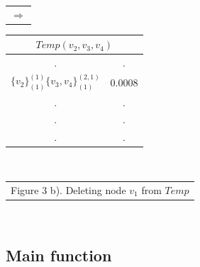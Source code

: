\documentclass[11pt]{article}
\begin{document}
\begin{table}[!htb]
\begin{minipage}{.06\linewidth}
        \begin{tabular}{c}
     $ \Rightarrow$\\
        \end{tabular}
    \end{minipage}%
    \begin{minipage}{.3\linewidth}
      \centering
     \begin{tabular}{cc}
\multicolumn{2}{c}{$Temp(v_2,v_3,v_4)$}                           \\ \hline
\multicolumn{1}{|c}{.} & \multicolumn{1}{|c|}{.} \\ \hline
  \multicolumn{1}{|l}{$\{v_2\}^{(1)}_{(1)}\{v_3,v_4\}^{(2,1)}_{(1)}$} & \multicolumn{1}{|l|}{$0.0008$} \\ \hline         
                   \multicolumn{1}{|c}{.} & \multicolumn{1}{|c|}{.} \\ \hline                 
                   \multicolumn{1}{|c}{.} & \multicolumn{1}{|c|}{.} \\ \hline
                   \multicolumn{1}{|c}{.} & \multicolumn{1}{|c|}{.} \\ \hline        
\end{tabular}
    \end{minipage}\\
      \begin{minipage}{1.0\linewidth}
       \centering
            \begin{tabular}{c}
Figure 3 b). Deleting node $v_1$ from $Temp$
        \end{tabular}
    \end{minipage}\\
\end{table}

\subsection{Main function}
\end{document}
